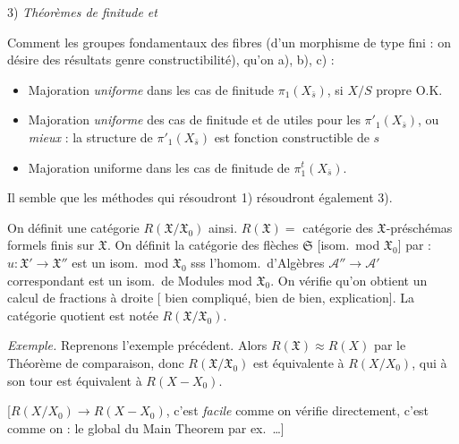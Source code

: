 \documentclass[11pt,a4paper]{article}
\begin{document}
3) \emph{Théorèmes de finitude et }

Comment les groupes fondamentaux des fibres (d'un morphisme de type fini :
on désire des résultats genre constructibilité), qu'on \ill{} a), b), c) :


\begin{itemize}
\item[a)] Majoration  \emph{uniforme} dans les
cas de finitude  $\pi_1(X_{\bar s})$, si $X/S$ propre O.K.

\item[b)] Majoration \emph{uniforme}  des cas de finitude et de
\ill{} utiles pour les $\pi'_1(X_{\bar s})$, ou \emph{mieux} : la structure de
$\pi'_1(X_{\bar s})$ est fonction constructible de $s$

\item[c)] Majoration uniforme dans les cas de finitude de
$\pi^t_1(X_{\bar s})$.
\end{itemize}

Il semble que les méthodes qui résoudront 1) résoudront également 3).


On définit une catégorie $R(\mathfrak{X}/\mathfrak{X}_0)$ ainsi.
$R(\mathfrak{X}) = $ catégorie des $\mathfrak{X}$-préschémas formels finis sur
$\mathfrak{X}$. On définit la catégorie des flèches $\mathfrak{S}$ [isom.\ mod
$\mathfrak{X}_0$] par : $u : \mathfrak{X}' \to \mathfrak{X}''$ est un isom.\
mod $\mathfrak{X}_0$ sss l'homom.\ d'Algèbres
$\mathcal{A}'' \to \mathcal{A}'$ correspondant est un isom.\ de Modules mod
$\mathfrak{X}_0$. On vérifie qu'on obtient un calcul de fractions à droite
[ bien compliqué, \uncertain{détail} bien \ill{} de bien,
explication]. La catégorie quotient est notée
$R(\mathfrak{X}/\mathfrak{X}_0)$.

\emph{Exemple.} Reprenons l'exemple précédent. Alors
$R(\mathfrak{X}) \approx R(X)$ par le Théorème de comparaison, donc
$R(\mathfrak{X}/\mathfrak{X}_0)$ est équivalente à $R(X/X_0)$, qui à son tour
est équivalent à $R(X - X_0)$.


[$R(X/X_0) \to R(X - X_0)$, c'est \ill{} \emph{facile} comme on vérifie
directement, c'est \ill{} comme on \uncertain{voit} \ill{} : le \ill{} global
du Main Theorem par ex.\ \ldots]
\end{document}
